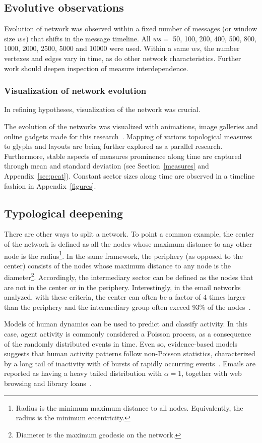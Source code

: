 \documentclass[%
 aip,
 jmp,%
 amsmath,amssymb,
 reprint,%
]{revtex4-1}
\begin{document}
   \subsection{Evolutive observations}
Evolution of network was observed within a fixed number of messages (or window size $ws$) that shifts in the message timeline.
 All $ws=$ 50, 100, 200, 400, 500, 800, 1000, 2000, 2500, 5000 and 10000 were used. Within a same $ws$, the number vertexes and edges vary in time, as do other network characteristics. Further work should deepen inspection of measure interdependence.

        \subsubsection*{Visualization of network evolution}
In refining hypotheses, visualization of the network was crucial.

The evolution of the networks was visualized with animations, image galleries and online gadgets made for this research~\cite{animacoes,galGMANE,appGMANE}. Mapping of various topological measures to glyphs and layouts are being further explored as a parallel research. Furthermore, stable aspects of measures prominence along time are captured through mean and standard deviation (see Section~\ref{measures} and Appendix~\ref{sec:pcat}). Constant sector sizes along time are observed in a timeline fashion in Appendix~\ref{figures}.

    \subsection{Typological deepening}
There are other ways to split a network. To point a common example, the center of the network is defined as all the nodes whose maximum distance to any other node is the radius\footnote{Radius is the minimum maximum distance to all nodes. Equivalently, the radius is the minimum eccentricity.}. 
In the same framework, the periphery (as opposed to the center) consists of the nodes whose maximum distance to any node is the diameter\footnote{Diameter is the maximum geodesic on the network.}. Accordingly, the intermediary sector can be defined as the nodes that are not in the center or in the periphery. Interestingly, in the email networks analyzed, with these criteria, the center can often be a factor of 4 times larger than the periphery and the intermediary group often exceed 93\% of the nodes~\cite{networkx}.

Models of human dynamics can be used to predict and classify activity. In this case, agent activity is commonly considered a Poisson process, as a consequence of the randomly distributed events in time. Even so, evidence-based models suggests that human activity patterns follow non-Poisson statistics, characterized by a long tail of inactivity with of bursts of rapidly occurring events~\cite{barabasiHumanDyn,barabasiPhone}. Emails are reported as having a heavy tailed distribution with $\alpha=1$, together with web browsing and library loans~\cite{barabasiHumanDyn}.
\end{document}
